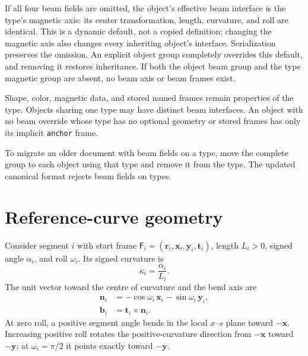 \documentclass[11pt,a4paper]{article}
\newcommand{\Frame}{\mathsf{F}}
\begin{document}
If all four beam fields are omitted, the object's effective beam interface
is the type's magnetic axis: its center transformation, length, curvature,
and roll are identical. This is a dynamic default, not a copied definition;
changing the magnetic axis also changes every inheriting object's interface.
Serialization preserves the omission. An explicit object group completely
overrides this default, and removing it restores inheritance. If both the
object beam group and the type magnetic group are absent, no beam axis or
beam frames exist.

Shape, color, magnetic data, and stored named frames remain properties of the
type. Objects sharing one type may have distinct beam interfaces. An object
with no beam override whose type has no optional geometry or stored frames
has only its implicit \texttt{anchor} frame.

To migrate an older document with beam fields on a type, move the complete
group to each object using that type and remove it from the type. The updated
canonical format rejects beam fields on types.

\section{Reference-curve geometry}
\label{sec:curve-geometry}

Consider segment $i$ with start frame
$\Frame_i=(\mathbf{r}_i,\mathbf{x}_i,\mathbf{y}_i,\mathbf{t}_i)$,
length $L_i>0$, signed angle $\alpha_i$, and roll $\omega_i$.  Its signed
curvature is
\begin{equation}
  \kappa_i=\frac{\alpha_i}{L_i}.
\end{equation}
The unit vector toward the centre of curvature and the bend axis are
\begin{align}
  \mathbf{n}_i
    &=-\cos\omega_i\,\mathbf{x}_i-
      \sin\omega_i\,\mathbf{y}_i,\\
  \mathbf{b}_i&=\mathbf{t}_i\times\mathbf{n}_i.
  \label{eq:bend-plane}
\end{align}
At zero roll, a positive segment angle bends in the local $x$--$s$ plane
toward $-\mathbf{x}$.  Increasing positive roll rotates the positive-curvature
direction from $-\mathbf{x}$ toward $-\mathbf{y}$; at $\omega_i=\pi/2$ it
points exactly toward $-\mathbf{y}$.
\end{document}
